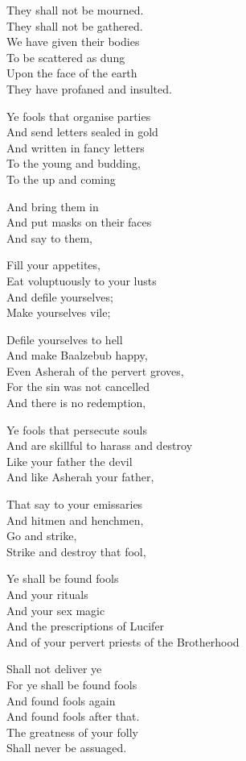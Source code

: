 \documentclass[
]{book}
\begin{document}
They shall not be mourned.\\
They shall not be gathered.\\
We have given their bodies\\
To be scattered as dung\\
Upon the face of the earth\\
They have profaned and insulted.

Ye fools that organise parties\\
And send letters sealed in gold\\
And written in fancy letters\\
To the young and budding,\\
To the up and coming

And bring them in\\
And put masks on their faces\\
And say to them,

Fill your appetites,\\
Eat voluptuously to your lusts\\
And defile yourselves;\\
Make yourselves vile;

Defile yourselves to hell\\
And make Baalzebub happy,\\
Even Asherah of the pervert groves,\\
For the sin was not cancelled\\
And there is no redemption,

Ye fools that persecute souls\\
And are skillful to harass and destroy\\
Like your father the devil\\
And like Asherah your father,

That say to your emissaries\\
And hitmen and henchmen,\\
Go and strike,\\
Strike and destroy that fool,

Ye shall be found fools\\
And your rituals\\
And your sex magic\\
And the prescriptions of Lucifer\\
And of your pervert priests of the Brotherhood

Shall not deliver ye\\
For ye shall be found fools\\
And found fools again\\
And found fools after that.\\
The greatness of your folly\\
Shall never be assuaged.
\end{document}
